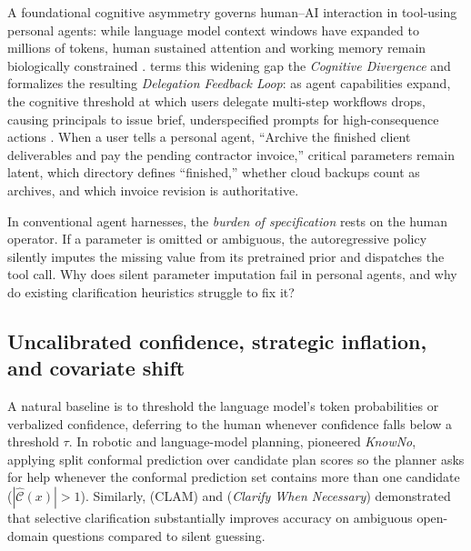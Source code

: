 \documentclass[11pt]{article}
\begin{document}
A foundational cognitive asymmetry governs human--AI interaction in tool-using personal agents: while language model context windows have expanded to millions of tokens, human sustained attention and working memory remain biologically constrained \citep{eliav2026divergence, john1988_14, bainbridge1983ironies}. \citet{eliav2026divergence} terms this widening gap the \emph{Cognitive Divergence} and formalizes the resulting \emph{Delegation Feedback Loop}: as agent capabilities expand, the cognitive threshold at which users delegate multi-step workflows drops, causing principals to issue brief, underspecified prompts for high-consequence actions \citep{yao2024taubench, shao2025workbank}. When a user tells a personal agent, ``Archive the finished client deliverables and pay the pending contractor invoice,'' critical parameters remain latent, which directory defines ``finished,'' whether cloud backups count as archives, and which invoice revision is authoritative.

In conventional agent harnesses, the \emph{burden of specification} rests on the human operator. If a parameter is omitted or ambiguous, the autoregressive policy silently imputes the missing value from its pretrained prior and dispatches the tool call. Why does silent parameter imputation fail in personal agents, and why do existing clarification heuristics struggle to fix it?

\subsection{Uncalibrated confidence, strategic inflation, and covariate shift}

A natural baseline is to threshold the language model's token probabilities or verbalized confidence, deferring to the human whenever confidence falls below a threshold $\tau$. In robotic and language-model planning, \citet{ren2023knowno} pioneered \emph{KnowNo}, applying split conformal prediction \citep{vovk2005conformal} over candidate plan scores so the planner asks for help whenever the conformal prediction set contains more than one candidate ($|\hat{\mathcal{C}}(x)| > 1$). Similarly, \citet{kuhn2023clam} (CLAM) and \citet{zhang2024clarify} (\emph{Clarify When Necessary}) demonstrated that selective clarification substantially improves accuracy on ambiguous open-domain questions compared to silent guessing.
\end{document}
